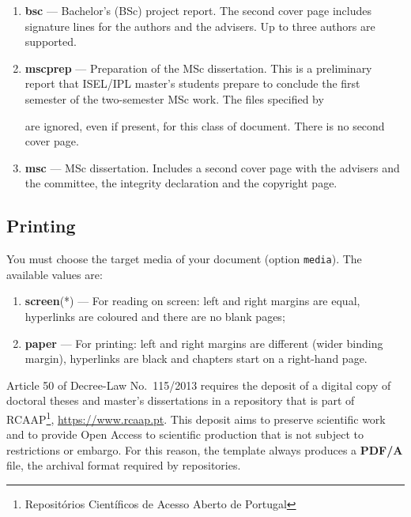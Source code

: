 \begin{enumerate}
	\item \textbf{bsc} --- Bachelor's (BSc) project report. The second cover page includes signature lines for the authors and the advisers. Up to three authors are supported.
	\item \textbf{mscprep} --- Preparation of the MSc dissertation. This is a preliminary report that ISEL/IPL master's students prepare to conclude the first semester of the two-semester MSc work. The files specified by 
	are ignored, even if present, for this class of document. There is no second cover page.
	\item \textbf{msc} --- MSc dissertation. Includes a second cover page with the advisers and the committee, the integrity declaration and the copyright page.
\end{enumerate}

\subsection{Printing} %
\label{sub:printing}

You must choose the target media of your document (option \texttt{media}). The available values are:

\begin{enumerate}
	\item \textbf{screen}(*) --- For reading on screen: left and right margins are equal, hyperlinks are coloured and there are no blank pages;
	\item \textbf{paper} --- For printing: left and right margins are different (wider binding margin), hyperlinks are black and chapters start on a right-hand page.
\end{enumerate}

Article 50 of Decree-Law No.~115/2013 requires the deposit of a digital copy of doctoral theses and master's dissertations in a repository that is part of RCAAP\footnote{Repositórios Científicos de Acesso Aberto de Portugal}, \url{https://www.rcaap.pt}. This deposit aims to preserve scientific work and to provide Open Access to scientific production that is not subject to restrictions or embargo. For this reason, the template always produces a \textbf{PDF/A} file, the archival format required by repositories.

